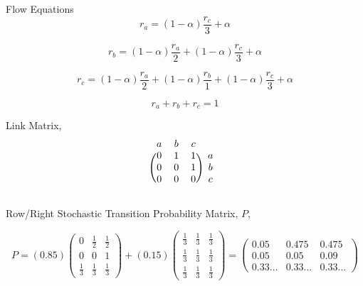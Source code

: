\documentclass[12pt]{article}
\begin{document}
Flow Equations
\begin{equation}
	r_a =  (1-\alpha)\frac{r_c}{3} + \alpha
\end{equation}

\begin{equation}
	r_b = (1-\alpha)\frac{r_a}{2} + (1-\alpha)\frac{r_c}{3} + \alpha
\end{equation}

\begin{equation}
	r_c = (1-\alpha)\frac{r_a}{2} + (1-\alpha)\frac{r_b}{1} + (1-\alpha)\frac{r_c}{3} + \alpha
\end{equation}

\begin{equation}
	r_a + r_b + r_c = 1
\end{equation}


%
%

Link Matrix,
\[
\begin{blockarray}{cccc}
a & b & c \\
\begin{block}{(ccc)c}
  0 & 1 & 1 & a \\
  0 & 0 & 1 & b \\
  0 & 0 & 0 & c \\
\end{block}
\end{blockarray}
\]

Row/Right Stochastic Transition Probability Matrix, $P$, 

$$
P = 
\left( 0.85 \right)
\begin{pmatrix} 
  0 	& \frac{1}{2} 	& \frac{1}{2}  \\
  0 	& 0 			& 1 		 \\
  \frac{1}{3} 	& \frac{1}{3} 	& \frac{1}{3}
\end{pmatrix}
 + 
\left( 0.15 \right)
\begin{pmatrix} 
  \frac{1}{3} 	& \frac{1}{3} 	& \frac{1}{3} \\
  \frac{1}{3} 	& \frac{1}{3} 	& \frac{1}{3} \\
  \frac{1}{3} 	& \frac{1}{3} 	& \frac{1}{3}
\end{pmatrix}
=
\begin{pmatrix} 
  0.05 	& 0.475 	& 0.475 \\
  0.05 	& 0.05 	& 0.09 \\
  0.33 \dots 	&  0.33 \dots 	&  0.33 \dots
\end{pmatrix}
$$


\fi
\end{document}
